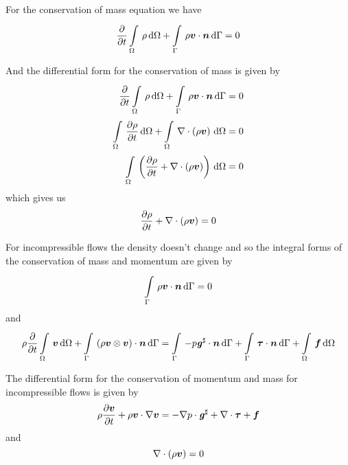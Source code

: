For the conservation of mass equation we have
\begin{equation}
  \delby{}{t}\gint{\Omega}{}{\rho}{\Omega}+\gint{\Gamma}{}{\dotprod{\rho\vectr{v}}{\vectr{n}}}{\Gamma}=0
  \label{eqn:NSEIntegralConservationOfMass}
\end{equation}

And the differential form for the conservation of mass is given by
\begin{equation}
  \begin{split}
    \delby{}{t}\gint{\Omega}{}{\rho}{\Omega}+\gint{\Gamma}{}{\dotprod{\rho\vectr{v}}{\vectr{n}}}{\Gamma}&=0
    \\
    \gint{\Omega}{}{\delby{\rho}{t}}{\Omega}+\gint{\Omega}{}{\divergence{}{\pbrac{\rho\vectr{v}}}}{\Omega}&=0\\
    \gint{\Omega}{}{\pbrac{\delby{\rho}{t}+\divergence{}{\pbrac{\rho\vectr{v}}}}}{\Omega}&=0
  \end{split}
\end{equation}
which gives us
\begin{equation}
  \delby{\rho}{t}+\divergence{}{\pbrac{\rho\vectr{v}}}=0
  \label{eqn:NSEDifferentialConservationOfMass}
\end{equation}

For incompressible flows the density doesn't change and so the integral forms
of the conservation of mass and momentum are given by
\begin{equation}
  \gint{\Gamma}{}{\dotprod{\rho\vectr{v}}{\vectr{n}}}{\Gamma}=0
\end{equation}
and
\begin{equation}
  \rho\delby{}{t}\gint{\Omega}{}{\vectr{v}}{\Omega}
  +\gint{\Gamma}{}{\dotprod{\pbrac{\tensorprod{\rho\vectr{v}}{\vectr{v}}}}{\vectr{n}}}{\Gamma}
  =\gint{\Gamma}{}{\dotprod{-p\sharptensor{\tensor{g}}}{\vectr{n}}}{\Gamma}
  +\gint{\Gamma}{}{\dotprod{\tensor{\tau}}{\vectr{n}}}{\Gamma}
  +\gint{\Omega}{}{\vectr{f}}{\Omega}
\end{equation}

The differential form for the conservation of momentum and mass for
incompressible flows is given by
\begin{equation}
  \rho\delby{\vectr{v}}{t}+\dotprod{\rho\vectr{v}}{\gradient{}{\vectr{v}}}
  =-\dotprod{\gradient{}{p}}{\sharptensor{\tensor{g}}}+\divergence{}{\tensor{\tau}}+\vectr{f}
  \label{eqn:DiffIncompNSEMomentum}
\end{equation}
and
\begin{equation}
  \divergence{}{\pbrac{\rho\vectr{v}}}=0
  \label{eqn:DiffIncompNSEMass}
\end{equation}

